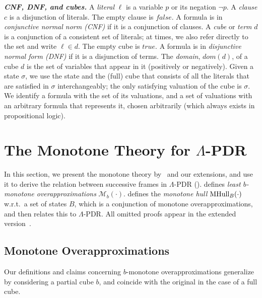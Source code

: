 \documentclass[acmsmall,screen]{acmart}
\newcommand{\para}[1]{\vspace{2pt}\noindent\textbf{\textit{#1.}}}
\newcommand{\dom}[1]{dom({#1})}
\newcommand{\true}{{\textit{true}}}
\newcommand{\false}{{\textit{false}}}
\newcommand{\monox}[2]{\mathcal{M}_{#2}({#1})}
\newcommand{\mhull}[2]{{\rm MHull}_{#2}({#1})}
\newcommand{\cubdom}[1]{\dom{#1}}
\begin{document}
\para{CNF, DNF, and cubes}
A \emph{literal} $\ell$ is a variable $p$ or its negation $\neg p$.
%
A \emph{clause} $c$ is a disjunction of %
literals. %
The empty clause is $\false$.
A formula is in \emph{conjunctive normal norm (CNF)} if it is a conjunction of clauses.
A \emph{cube} or \emph{term} $d$ is a conjunction of a consistent set of literals; at times, we also refer directly to the set and write $\ell \in d$. The empty cube is $\true$.
A formula is in \emph{disjunctive normal form (DNF)} if it is a disjunction of terms.
The \emph{domain}, $\cubdom{d}$, of a cube $d$ is the set of variables that appear in it (positively or negatively).
Given a state $\sigma$, we use the state and the (full) cube that consists of all the literals that are satisfied in $\sigma$ interchangeably; the only satisfying valuation of the cube is $\sigma$.
%
We identify a formula with the set of its valuations, and a set of valuations with an arbitrary formula that represents it, chosen arbitrarily (which always exists in propositional logic).
%
%
%
 
%
\section{The Monotone Theory for $\Lambda$-PDR}
\label{sec:monotone}
In this section, we present the monotone theory by~\citet{DBLP:journals/iandc/Bshouty95} and our extensions, and use it to derive the relation between successive frames in $\Lambda$-PDR ().
 defines \emph{least $b$-monotone overapproximations} $\monox{\cdot}{b}$.
 defines the \emph{monotone hull} $\mhull{\cdot}{B}$ w.r.t.\ a set of states $B$, which is a conjunction of monotone overapproximations, and then relates this to $\Lambda$-PDR.
\iflong
\else
All omitted proofs appear in the extended version~\cite{extendedVersion}.
\fi
%

\subsection{Monotone Overapproximations}
\label{sec:monotone-background}
Our definitions and claims concerning $b$-monotone overapproximations %
generalize \citet{DBLP:journals/iandc/Bshouty95} by considering a partial cube $b$, and coincide with the original in the case of a full cube.
%
%
%
%
\end{document}
